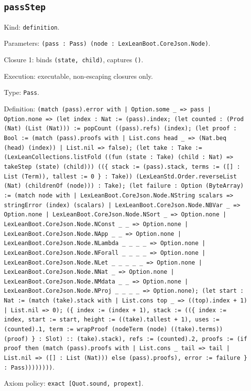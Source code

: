 \documentclass[11pt]{article}
\begin{document}
\subsection*{\texttt{passStep}}
\noindent Kind: \texttt{definition}.\par
\noindent Parameters: \texttt{(pass : Pass) (node : LexLeanBoot.CoreJson.Node)}.\par
\noindent Closure 1: binds \texttt{(state, child)}, captures \texttt{()}.\par
\noindent Execution: executable, non-escaping closures only.\par
\noindent Type: \texttt{Pass}.\par
\noindent Definition: \texttt{(match (pass).error with | Option.some \_ => pass | Option.none => (let index : Nat := (pass).index; (let counted : (Prod (Nat) (List (Nat))) := popCount ((pass).refs) (index); (let proof : Bool := (match (pass).proofs with | List.cons head \_ => (Nat.beq (head) (index)) | List.nil => false); (let take : Take := (LexLeanCollections.listFold ((fun (state : Take) (child : Nat) => takeStep (state) (child))) ((\{ stack := (pass).stack, terms := ([] : List (Term)), tallest := 0 \} : Take)) (LexLeanStd.Order.reverseList (Nat) (childrenOf (node))) : Take); (let failure : Option (ByteArray) := (match node with | LexLeanBoot.CoreJson.Node.NString scalars => stringError (index) (scalars) | LexLeanBoot.CoreJson.Node.NBVar \_ => Option.none | LexLeanBoot.CoreJson.Node.NSort \_ => Option.none | LexLeanBoot.CoreJson.Node.NConst \_ \_ => Option.none | LexLeanBoot.CoreJson.Node.NApp \_ \_ => Option.none | LexLeanBoot.CoreJson.Node.NLambda \_ \_ \_ \_ => Option.none | LexLeanBoot.CoreJson.Node.NForall \_ \_ \_ \_ => Option.none | LexLeanBoot.CoreJson.Node.NLet \_ \_ \_ \_ \_ => Option.none | LexLeanBoot.CoreJson.Node.NNat \_ => Option.none | LexLeanBoot.CoreJson.Node.NMdata \_ \_ => Option.none | LexLeanBoot.CoreJson.Node.NProj \_ \_ \_ \_ => Option.none); (let start : Nat := (match (take).stack with | List.cons top \_ => ((top).index + 1) | List.nil => 0); (\{ index := (index + 1), stack := ((\{ index := index, start := start, height := ((take).tallest + 1), uses := (counted).1, term := wrapProof (nodeTerm (node) ((take).terms)) (proof) \} : Slot) :: (take).stack), refs := (counted).2, proofs := (if proof then (match (pass).proofs with | List.cons \_ tail => tail | List.nil => ([] : List (Nat))) else (pass).proofs), error := failure \} : Pass))))))))}.\par
\noindent Axiom policy: \texttt{exact [Quot.sound, propext]}.\par
\end{document}
